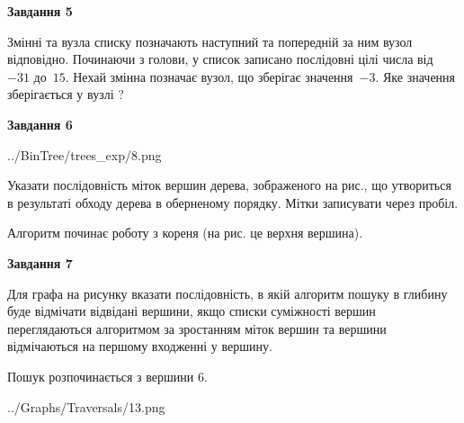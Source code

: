 \documentclass[12pt, ukrainian]{article}
\begin{document}
{\begin {large}
{\begin {center}\textbf{Завдання 5}\end {center}}\par
Змінні  та  вузла списку позначають наступний та попередній за ним вузол відповідно. Починаючи з голови, у список записано послідовні цілі числа від~$-31$ до~$15$. Нехай змінна  позначає вузол, що зберігає значення~$-3$.
Яке значення зберігається у вузлі  ?\par
\newpage

{\begin {center}\textbf{Завдання 6}\end {center}}\par

\begin{center}
	{../BinTree/trees_exp/8.png}
\end{center}
Указати послідовність міток вершин дерева, зображеного на рис., що утвориться в результаті обходу дерева в оберненому порядку. Мітки записувати через пробіл.\par Алгоритм починає роботу з кореня (на рис. це верхня вершина).\par
\newpage

{\begin {center}\textbf{Завдання 7}\end {center}}\par
Для графа на рисунку вказати послідовність, в якій алгоритм пошуку в глибину буде відмічати відвідані вершини, якщо списки суміжності вершин переглядаються алгоритмом за зростанням міток вершин та вершини відмічаються на першому вход\-женні у вершину.\par
Пошук розпочинається з вершини 6.\par

\begin{center}
	{../Graphs/Traversals/13.png}
\end{center}\par
\newpage


\end{large}}
\end{document}
